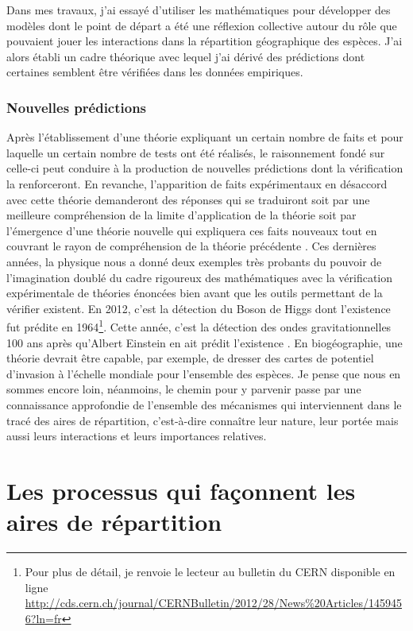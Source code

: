 Dans mes travaux, j'ai essayé d'utiliser les mathématiques pour
développer des modèles dont le point de départ a été une réflexion
collective autour du rôle que pouvaient jouer les interactions dans la
répartition géographique des espèces. J'ai alors établi un cadre
théorique avec lequel j'ai dérivé des prédictions dont certaines
semblent être vérifiées dans les données empiriques.

\subsubsection*{Nouvelles prédictions}\label{nouvelles-pruxe9dictions}

Après l'établissement d'une théorie expliquant un certain nombre de
faits et pour laquelle un certain nombre de tests ont été réalisés, le
raisonnement fondé sur celle-ci peut conduire à la production de
nouvelles prédictions dont la vérification la renforceront. En revanche,
l'apparition de faits expérimentaux en désaccord avec cette théorie
demanderont des réponses qui se traduiront soit par une meilleure
compréhension de la limite d'application de la théorie soit par
l'émergence d'une théorie nouvelle qui expliquera ces faits nouveaux
tout en couvrant le rayon de compréhension de la théorie précédente
\citep{Popper1959}. Ces dernières années, la physique nous a donné deux
exemples très probants du pouvoir de l'imagination doublé du cadre
rigoureux des mathématiques avec la vérification expérimentale de
théories énoncées bien avant que les outils permettant de la vérifier
existent. En 2012, c'est la détection du Boson de Higgs dont l'existence
fut prédite en 1964\footnote{Pour plus de détail, je renvoie le lecteur
  au bulletin du CERN disponible en ligne
  \url{http://cds.cern.ch/journal/CERNBulletin/2012/28/News\%20Articles/1459456?ln=fr}}.
Cette année, c'est la détection des ondes gravitationnelles 100 ans
après qu'Albert Einstein en ait prédit l'existence \citep{Waldrop2016}.
En biogéographie, une théorie devrait être capable, par exemple, de
dresser des cartes de potentiel d'invasion à l'échelle mondiale pour
l'ensemble des espèces. Je pense que nous en sommes encore loin,
néanmoins, le chemin pour y parvenir passe par une connaissance
approfondie de l'ensemble des mécanismes qui interviennent dans le tracé
des aires de répartition, c'est-à-dire connaître leur nature, leur
portée mais aussi leurs interactions et leurs importances relatives.

\section*{Les processus qui façonnent les aires de
répartition}\label{les-processus-qui-fauxe7onnent-les-aires-de-ruxe9partition}

